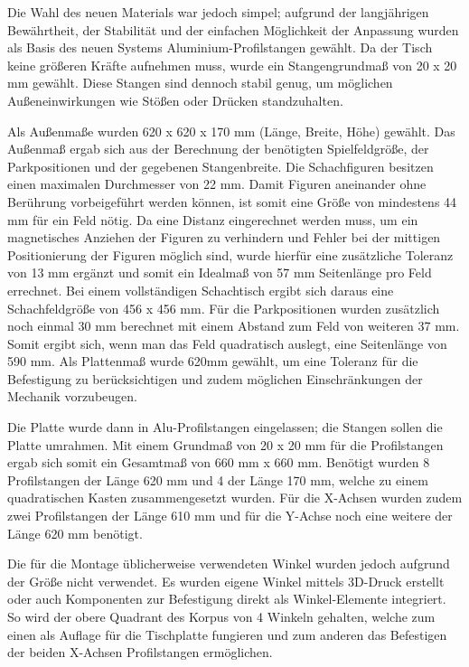 Die Wahl des neuen Materials war jedoch simpel; aufgrund der
langjährigen Bewährtheit, der Stabilität und der einfachen Möglichkeit
der Anpassung wurden als Basis des neuen Systems Aluminium-Profilstangen
gewählt. Da der Tisch keine größeren Kräfte aufnehmen muss, wurde ein
Stangengrundmaß von 20 x 20 mm gewählt. Diese Stangen sind dennoch
stabil genug, um möglichen Außeneinwirkungen wie Stößen oder Drücken
standzuhalten.

Als Außenmaße wurden 620 x 620 x 170 mm (Länge, Breite, Höhe) gewählt.
Das Außenmaß ergab sich aus der Berechnung der benötigten
Spielfeldgröße, der Parkpositionen und der gegebenen Stangenbreite. Die
Schachfiguren besitzen einen maximalen Durchmesser von 22 mm. Damit
Figuren aneinander ohne Berührung vorbeigeführt werden können, ist somit
eine Größe von mindestens 44 mm für ein Feld nötig. Da eine Distanz
eingerechnet werden muss, um ein magnetisches Anziehen der Figuren zu
verhindern und Fehler bei der mittigen Positionierung der Figuren
möglich sind, wurde hierfür eine zusätzliche Toleranz von 13 mm ergänzt
und somit ein Idealmaß von 57 mm Seitenlänge pro Feld errechnet. Bei
einem vollständigen Schachtisch ergibt sich daraus eine Schachfeldgröße
von 456 x 456 mm. Für die Parkpositionen wurden zusätzlich noch einmal
30 mm berechnet mit einem Abstand zum Feld von weiteren 37 mm. Somit
ergibt sich, wenn man das Feld quadratisch auslegt, eine Seitenlänge von
590 mm. Als Plattenmaß wurde 620mm gewählt, um eine Toleranz für die
Befestigung zu berücksichtigen und zudem möglichen Einschränkungen der
Mechanik vorzubeugen.

Die Platte wurde dann in Alu-Profilstangen eingelassen; die Stangen
sollen die Platte umrahmen. Mit einem Grundmaß von 20 x 20 mm für die
Profilstangen ergab sich somit ein Gesamtmaß von 660 mm x 660 mm.
Benötigt wurden 8 Profilstangen der Länge 620 mm und 4 der Länge 170 mm,
welche zu einem quadratischen Kasten zusammengesetzt wurden. Für die
X-Achsen wurden zudem zwei Profilstangen der Länge 610 mm und für die
Y-Achse noch eine weitere der Länge 620 mm benötigt.

Die für die Montage üblicherweise verwendeten Winkel wurden jedoch
aufgrund der Größe nicht verwendet. Es wurden eigene Winkel mittels
3D-Druck erstellt oder auch Komponenten zur Befestigung direkt als
Winkel-Elemente integriert. So wird der obere Quadrant des Korpus von 4
Winkeln gehalten, welche zum einen als Auflage für die Tischplatte
fungieren und zum anderen das Befestigen der beiden X-Achsen
Profilstangen ermöglichen.

